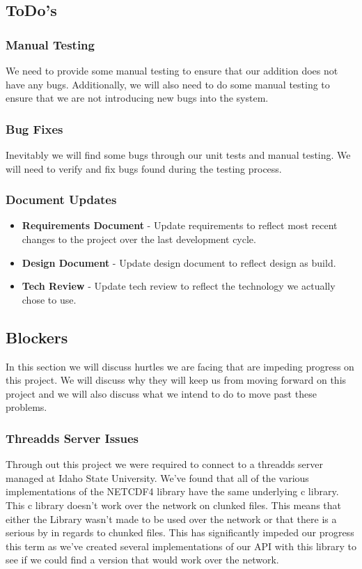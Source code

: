 \documentclass[onecolumn, draftclsnofoot,10pt, compsoc]{article}
\begin{document}
		
	\subsection{ToDo's}
		
		\subsubsection{Manual Testing} We need to provide some manual testing to ensure that our addition does not have any bugs. Additionally, we will also need to do some manual testing to ensure that we are not introducing new bugs into the system.\\
		
		\subsubsection{Bug Fixes} Inevitably we will find some bugs through our unit tests and manual testing. We will need to verify and fix bugs found during the testing process.\\
		
		\subsubsection{Document Updates}
			\begin{itemize}
				\item \textbf{Requirements Document} - Update requirements to reflect most recent changes to the project over the last development cycle.
				\item \textbf{Design Document} - Update design document to reflect design as build.
				\item \textbf{Tech Review} - Update tech review to reflect the technology we actually chose to use.
			\end{itemize}

	\subsection{Blockers}
	    In this section we will discuss hurtles we are facing that are impeding progress on this project. We will discuss why they will keep us from moving forward on this project and we will also discuss what we intend to do to move past these problems.\\
			
			\subsubsection{Threadds Server Issues} Through out this project we were required to connect to a threadds server managed at Idaho State University. We've found that all of the various implementations of the NETCDF4 library have the same underlying c library. This c library doesn't work over the network on clunked files. This means that either the Library wasn't made to be used over the network or that there is a serious by in regards to chunked files. This has significantly impeded our progress this term as we've created several implementations of our API with this library to see if we could find a version that would work over the network.\\
			
\end{document}
